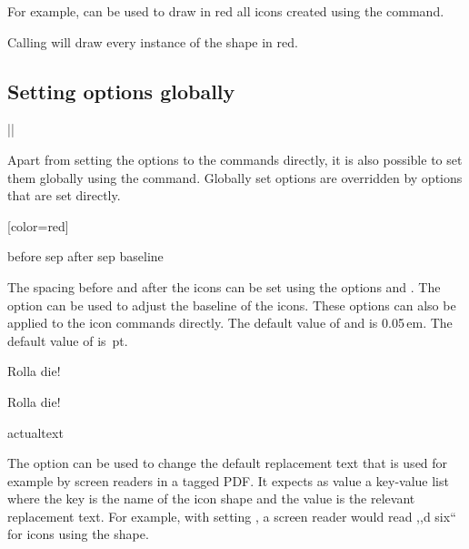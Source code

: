 \documentclass[a4paper]{article}
\begin{document}
For example,  can be used to draw in red all icons created using the \macro{\die} command.

Calling  will draw every instance of the  shape in red.

\subsection{Setting options globally}

\begin{macrodef}
|\rpgiconsset|
\end{macrodef}
Apart from setting the options to the commands directly, it is also possible to set them globally using the \macro{\rpgiconsset} command. Globally set options are overridden by options that are set directly.

\begin{codeexample}

[color=red]
\end{codeexample}

\begin{macrodef}
before sep
after sep
baseline
\end{macrodef}
The spacing before and after the icons can be set using the options  and . The option  can be used to adjust the baseline of the icons. These options can also be applied to the icon commands directly. The default value of  and  is 0.05\,em. The default value of  is \,pt.

\begin{codeexample}
Rolla die!

Rolla die!
\end{codeexample}

\begin{macrodef}
actualtext
\end{macrodef}
The option  can be used to change the default replacement text that is used for example by screen readers in a tagged PDF. It expects as value a key-value list where the key is the name of the icon shape and the value is the relevant replacement text. For example, with setting , a screen reader would read ,,d six`` for icons using the  shape.
\end{document}
